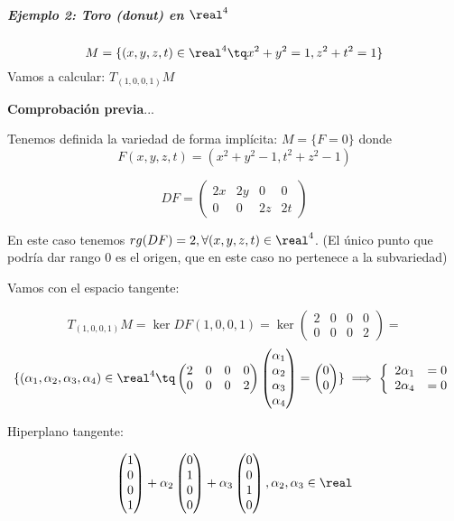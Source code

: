 \subparagraph{Ejemplo 2: Toro (donut) en $\real^4$}

\[M = \{ (x,y,z,t)\in \real^4 \tq x^2+y^2 = 1, z^2+t^2 = 1\}\]
Vamos a calcular: $T_{(1,0,0,1)}M$

\textbf{Comprobación previa}...

Tenemos definida la variedad de forma implícita: $M = \{F = 0\}$ donde \[F(x,y,z,t) = (x^2+y^2-1,t^2+z^2-1)\]

\[DF = \begin{pmatrix}
2x&2y&0&0\\
0&0&2z&2t
\end{pmatrix}\]

En este caso tenemos $rg(DF) = 2, \forall (x,y,z,t)\in \real^4$. (El único punto que podría dar rango 0 es el origen, que en este caso no pertenece a la subvariedad)

Vamos con el espacio tangente:

\[T_{(1,0,0,1)}M = \ker DF (1,0,0,1) = \ker \begin{pmatrix}
2&0&0&0\\
0&0&0&2
\end{pmatrix} =\]
\[ \{ (\alpha_1,\alpha_2,\alpha_3,\alpha_4) \in \real^4 \tq \begin{pmatrix}
2&0&0&0\\
0&0&0&2
\end{pmatrix} \begin{pmatrix}
\alpha_1\\
\alpha_2\\ \alpha_3\\ \alpha_4
\end{pmatrix} = \begin{pmatrix}
0 \\
0
\end{pmatrix}\} \implies \left\{\begin{array}{cc}2\alpha_1 &= 0\\ 2\alpha_4 & =0\end{array}\right.\]

Hiperplano tangente:

\[
\begin{pmatrix}
1\\0\\0\\1
\end{pmatrix}
+ \alpha_2 \begin{pmatrix}
0\\1\\0\\0 	
\end{pmatrix}
+ \alpha_3
\begin{pmatrix}
0\\0\\1\\0
\end{pmatrix}, \alpha_2,\alpha_3 \in \real
\]

